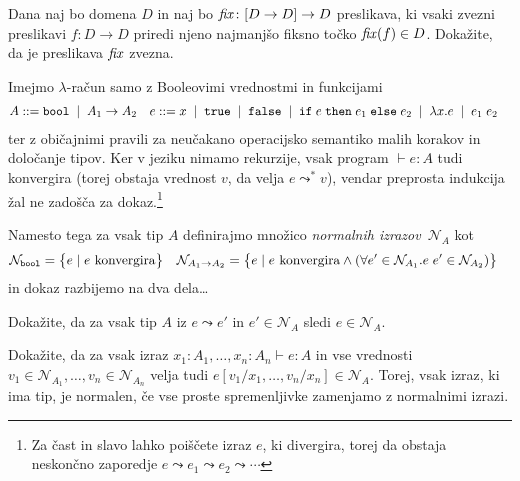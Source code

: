 \documentclass[arhiv]{izpit}
\begin{document}

\naloga[\tocke{20}]
Dana naj bo domena $D$ in naj bo $\mathit{fix} \colon [D \to D] \to D$ preslikava, ki vsaki zvezni preslikavi $f \colon D \to D$ priredi njeno najmanjšo fiksno točko $\mathit{fix}(f) \in D$. Dokažite, da je preslikava $\mathit{fix}$ zvezna.


\naloga[\tocke{20}]
\newcommand{\norm}[1]{\mathcal{N}_{#1}}
\newcommand{\conv}[1]{{#1 \! \downarrow}}
Imejmo $\lambda$-račun samo z Booleovimi vrednostmi in funkcijami
\begin{align*}
  A &\mathrel{{:}{:}{=}}
  \mathtt{bool} \;\mid\;
  A_1 \to A_2 &
  e &\mathrel{{:}{:}{=}}
  x \;\mid\;
  \mathtt{true} \;\mid\;
  \mathtt{false} \;\mid\;
  \mathtt{if}\;e\;\mathtt{then}\;e_1\;\mathtt{else}\;e_2 \;\mid\;
  \lambda x. e \;\mid\;
  e_1 \; e_2
\end{align*}
ter z običajnimi pravili za neučakano operacijsko semantiko malih korakov in določanje tipov. Ker v jeziku nimamo rekurzije, vsak program $\vdash e : A$ tudi konvergira (torej obstaja vrednost $v$, da velja $e \leadsto^* v$), vendar preprosta indukcija žal ne zadošča za dokaz.\footnote{Za čast in slavo lahko poiščete izraz $e$, ki divergira, torej da obstaja neskončno zaporedje
$e \leadsto e_1 \leadsto e_2 \leadsto \cdots$
}


Namesto tega za vsak tip $A$ definirajmo množico \emph{normalnih izrazov}~$\norm{A}$ kot
%
\begin{align*}
  \norm{\boolty} &=
    \big\{ e \mid \text{$e$ konvergira} \big\} &
  \norm{\funty{A_1}{A_2}} &=
    \big\{ e \mid \text{$e$ konvergira} \land (\forall e' \in \norm{A_1}. e \; e' \in \norm{A_2}) \big\}
\end{align*}
%
in dokaz razbijemo na dva dela\ldots

\podnaloga
Dokažite, da za vsak tip $A$ iz $e \leadsto e'$ in $e' \in \norm{A}$ sledi $e \in \norm{A}$.

\podnaloga
Dokažite, da za vsak izraz $x_1 : A_1, \dots, x_n : A_n \vdash e : A$ in vse vrednosti $v_1 \in \norm{A_1}, \dots, v_n \in \norm{A_n}$ velja tudi $e[v_1 / x_1, \dots, v_n / x_n] \in \norm{A}$. Torej, vsak izraz, ki ima tip, je normalen, če vse proste spremenljivke zamenjamo z normalnimi izrazi.
\end{document}
